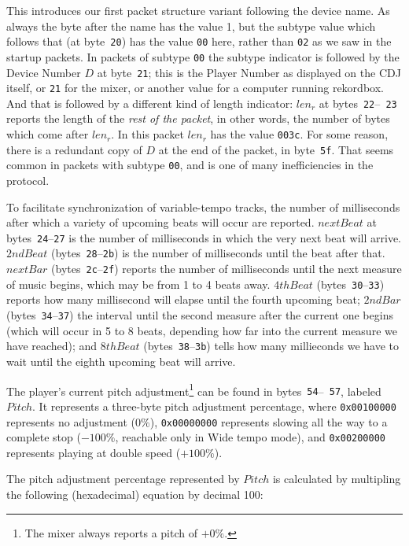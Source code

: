 \documentclass[11pt]{article}
\begin{document}
This introduces our first packet structure variant following the
device name. As always the byte after the name has the value 1, but
the subtype value which follows that (at byte~{\tt 20}) has the value
{\tt 00} here, rather than {\tt 02} as we saw in the startup packets.
In packets of subtype {\tt 00} the subtype indicator is followed by
the Device Number $D$ at byte~{\tt 21}; this is the Player Number as
displayed on the CDJ itself, or {\tt 21} for the mixer, or another
value for a computer running rekordbox. And that is followed by a
different kind of length indicator: $len_r$ at bytes~{\tt 22}--{\tt
  23} reports the length of the \emph{rest of the packet}, in other
words, the number of bytes which come after $len_r$. In this packet
$len_r$ has the value {\tt 003c}. For some reason, there is a
redundant copy of $D$ at the end of the packet, in byte~{\tt 5f}. That
seems common in packets with subtype {\tt 00}, and is one of many
inefficiencies in the protocol.

To facilitate synchronization of variable-tempo tracks, the number of
milliseconds after which a variety of upcoming beats will occur are
reported. $nextBeat$ at bytes~{\tt 24}--{\tt 27} is the number of
milliseconds in which the very next beat will arrive. $2ndBeat$
(bytes~{\tt 28}--{\tt 2b}) is the number of milliseconds until the
beat after that. $nextBar$ (bytes~{\tt 2c}--{\tt 2f}) reports the
number of milliseconds until the next measure of music begins, which
may be from 1 to 4 beats away. $4thBeat$ (bytes~{\tt 30}--{\tt 33})
reports how many millisecond will elapse until the fourth upcoming
beat; $2ndBar$ (bytes~{\tt 34}--{\tt 37}) the interval until the
second measure after the current one begins (which will occur in 5 to
8 beats, depending how far into the current measure we have reached);
and $8thBeat$ (bytes~{\tt 38}--{\tt 3b}) tells how many millieconds we
have to wait until the eighth upcoming beat will arrive.

The player's current pitch adjustment\footnote{The mixer always
  reports a pitch of $+0\%$.} can be found in bytes~{\tt 54}--{\tt
  57}, labeled $Pitch$. It represents a three-byte pitch adjustment
percentage, where {\tt 0x00100000} represents no adjustment ($0\%$),
{\tt 0x00000000} represents slowing all the way to a complete stop
($-100\%$, reachable only in Wide tempo mode), and {\tt 0x00200000}
represents playing at double speed ($+100\%$).

The pitch adjustment percentage represented by $Pitch$ is calculated
by multipling the following (hexadecimal) equation by decimal 100:
\end{document}
